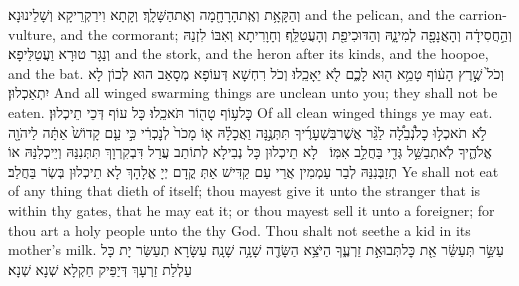 {וְהַקָּאָ֥ת וְאֶֽת\maqqaf הָרָחָ֖מָה וְאֶת\maqqaf הַשָּׁלָֽךְ׃}
{וְקָתָא וִירַקְרֵיקָא וְשָׁלֵינוּנָא׃}
{and the pelican, and the carrion-vulture, and the cormorant;}{}
{וְהַ֣חֲסִידָ֔ה וְהָאֲנָפָ֖ה לְמִינָ֑הּ וְהַדּוּכִיפַ֖ת וְהָעֲטַלֵּֽף׃}
{וְחָוָרִיתָא וְאִבּוֹ לִזְנַהּ וְנַגָּר טוּרָא וַעֲטַלֵּיפָא׃}
{and the stork, and the heron after its kinds, and the hoopoe, and the bat.}{}
{וְכֹל֙ שֶׁ֣רֶץ הָע֔וֹף טָמֵ֥א ה֖וּא לָכֶ֑ם לֹ֖א יֵאָכֵֽלוּ׃}
{וְכֹל רִחְשָׁא דְּעוֹפָא מְסָאַב הוּא לְכוֹן לָא יִתְאַכְלוּן׃}
{And all winged swarming things are unclean unto you; they shall not be eaten.}{}
{כׇּל\maqqaf ע֥וֹף טָה֖וֹר תֹּאכֵֽלוּ׃}
{כָּל עוֹף דְּכֵי תֵיכְלוּן׃}
{Of all clean winged things ye may eat.}{}
{לֹ֣א תֹאכְל֣וּ כׇל\maqqaf נְ֠בֵלָ֠ה לַגֵּ֨ר אֲשֶׁר\maqqaf בִּשְׁעָרֶ֜יךָ תִּתְּנֶ֣נָּה וַאֲכָלָ֗הּ א֤וֹ מָכֹר֙ לְנׇכְרִ֔י כִּ֣י עַ֤ם קָדוֹשׁ֙ אַתָּ֔ה לַיהֹוָ֖ה אֱלֹהֶ֑יךָ לֹֽא\maqqaf תְבַשֵּׁ֥ל גְּדִ֖י בַּחֲלֵ֥ב אִמּֽוֹ׃ \petucha }
{לָא תֵיכְלוּן כָּל נְבִילָא לְתוֹתַב עֲרַל דִּבְקִרְוָךְ תִּתְּנִנַּהּ וְיֵיכְלִנַּהּ אוֹ תְזַבְּנִנַּהּ לְבַר עַמְמִין אֲרֵי עַם קַדִּישׁ אַתְּ קֳדָם יְיָ אֱלָהָךְ לָא תֵיכְלוּן בְּשְׂר בַּחֲלַב׃}
{Ye shall not eat of any thing that dieth of itself; thou mayest give it unto the stranger that is within thy gates, that he may eat it; or thou mayest sell it unto a foreigner; for thou art a holy people unto the \lord\space thy God. Thou shalt not seethe a kid in its mother’s milk.}{}
{עַשֵּׂ֣ר תְּעַשֵּׂ֔ר אֵ֖ת כׇּל\maqqaf תְּבוּאַ֣ת זַרְעֶ֑ךָ הַיֹּצֵ֥א הַשָּׂדֶ֖ה שָׁנָ֥ה שָׁנָֽה׃}
{עַשָּׂרָא תְעַשַּׂר יָת כָּל עַלְלַת זַרְעָךְ דְּיַפֵּיק חַקְלָא שְׁנָא שְׁנָא׃}
